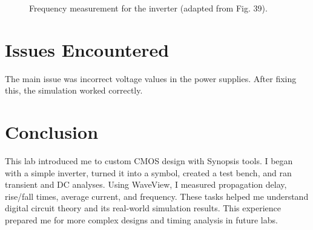 \documentclass[11pt]{article}
\begin{document}
\begin{figure}[h!]
    \centering
    \fbox{\rule{0.6\textwidth}{2in}}
    \caption{Frequency measurement for the inverter (adapted from Fig. 39).}
\end{figure}

\section*{Issues Encountered}
The main issue was incorrect voltage values in the power supplies. After fixing this, the simulation worked correctly.

\section*{Conclusion}
This lab introduced me to custom CMOS design with Synopsis tools. I began with a simple inverter, turned it into a symbol, created a test bench, and ran transient and DC analyses. Using WaveView, I measured propagation delay, rise/fall times, average current, and frequency. These tasks helped me understand digital circuit theory and its real-world simulation results. This experience prepared me for more complex designs and timing analysis in future labs.

\fi
\end{document}
